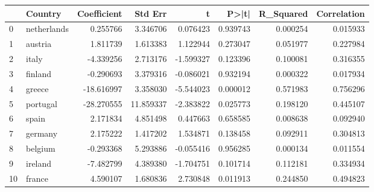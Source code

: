 \begin{tabular}{llrrrrrr}
\toprule
 & Country & Coefficient & Std Err & t & P>|t| & R_Squared & Correlation \\
\midrule
0 & netherlands & 0.255766 & 3.346706 & 0.076423 & 0.939743 & 0.000254 & 0.015933 \\
1 & austria & 1.811739 & 1.613383 & 1.122944 & 0.273047 & 0.051977 & 0.227984 \\
2 & italy & -4.339256 & 2.713176 & -1.599327 & 0.123396 & 0.100081 & 0.316355 \\
3 & finland & -0.290693 & 3.379316 & -0.086021 & 0.932194 & 0.000322 & 0.017934 \\
4 & greece & -18.616997 & 3.358030 & -5.544023 & 0.000012 & 0.571983 & 0.756296 \\
5 & portugal & -28.270555 & 11.859337 & -2.383822 & 0.025773 & 0.198120 & 0.445107 \\
6 & spain & 2.171834 & 4.851498 & 0.447663 & 0.658585 & 0.008638 & 0.092940 \\
7 & germany & 2.175222 & 1.417202 & 1.534871 & 0.138458 & 0.092911 & 0.304813 \\
8 & belgium & -0.293368 & 5.293886 & -0.055416 & 0.956285 & 0.000134 & 0.011554 \\
9 & ireland & -7.482799 & 4.389380 & -1.704751 & 0.101714 & 0.112181 & 0.334934 \\
10 & france & 4.590107 & 1.680836 & 2.730848 & 0.011913 & 0.244850 & 0.494823 \\
\bottomrule
\end{tabular}
